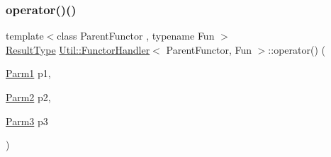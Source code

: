 \mbox{\label{classUtil_1_1FunctorHandler_a7f8257ee5864ceec038116184231eb63}} 
\subsubsection{\texorpdfstring{operator()()}{operator()()}\hspace{0.1cm}{\footnotesize\ttfamily [11/18]}}
{\footnotesize\ttfamily template$<$class Parent\+Functor , typename Fun $>$ \\
\mbox{\hyperlink{classUtil_1_1FunctorHandler_a036da44b8cc2567704cebd2a20d16c80}{Result\+Type}} \mbox{\hyperlink{classUtil_1_1FunctorHandler}{Util\+::\+Functor\+Handler}}$<$ Parent\+Functor, Fun $>$\+::operator() (\begin{DoxyParamCaption}\item[{\mbox{\hyperlink{classUtil_1_1FunctorHandler_a0a902ba40a0ab746f1c29a81d68ae0db}{Parm1}}}]{p1,  }\item[{\mbox{\hyperlink{classUtil_1_1FunctorHandler_a5fb5374c316f8ac252aa22fcdf7d21a7}{Parm2}}}]{p2,  }\item[{\mbox{\hyperlink{classUtil_1_1FunctorHandler_a25f1b9dd7890c1dbc68abc686f30bec8}{Parm3}}}]{p3 }\end{DoxyParamCaption})\hspace{0.3cm}{\ttfamily [inline]}}

\mbox{\label{classUtil_1_1FunctorHandler_a7f8257ee5864ceec038116184231eb63}} 

